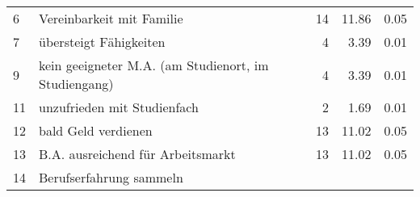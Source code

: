 \begin{longtable}{lXrrr}
     6 &
     \multicolumn{1}{X}{ Vereinbarkeit mit Familie   } &


       \num{14} &
       \num[round-mode=places,round-precision=2]{11,86} &
         \num[round-mode=places,round-precision=2]{0,05} \\

     7 &
     \multicolumn{1}{X}{ übersteigt Fähigkeiten   } &


       \num{4} &
       \num[round-mode=places,round-precision=2]{3,39} &
         \num[round-mode=places,round-precision=2]{0,01} \\

     9 &
     \multicolumn{1}{X}{ kein geeigneter M.A. (am Studienort, im Studiengang)   } &


       \num{4} &
       \num[round-mode=places,round-precision=2]{3,39} &
         \num[round-mode=places,round-precision=2]{0,01} \\

     11 &
     \multicolumn{1}{X}{ unzufrieden mit Studienfach   } &


       \num{2} &
       \num[round-mode=places,round-precision=2]{1,69} &
         \num[round-mode=places,round-precision=2]{0,01} \\

     12 &
     \multicolumn{1}{X}{ bald Geld verdienen   } &


       \num{13} &
       \num[round-mode=places,round-precision=2]{11,02} &
         \num[round-mode=places,round-precision=2]{0,05} \\

     13 &
     \multicolumn{1}{X}{ B.A. ausreichend für Arbeitsmarkt   } &


       \num{13} &
       \num[round-mode=places,round-precision=2]{11,02} &
         \num[round-mode=places,round-precision=2]{0,05} \\

     14 &
     \multicolumn{1}{X}{ Berufserfahrung sammeln   } &



\end{longtable}
